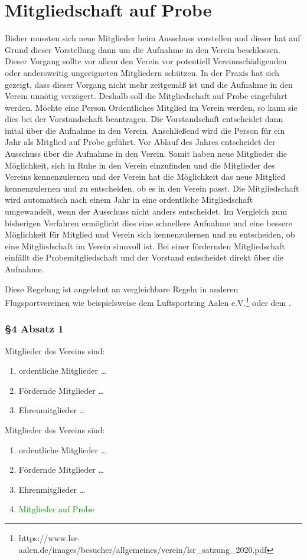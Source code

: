 \documentclass[10pt,a4paper,parskip=half]{scrartcl}
\newcommand{\new}[1]{\textcolor{Green}{#1}}
\newcommand{\change}[1]{
  \begin{adjustwidth}{20pt}{20pt}
    #1
  \end{adjustwidth}
}
\begin{document}
  \section{Mitgliedschaft auf Probe}
  Bisher mussten sich neue Mitglieder beim Ausschuss vorstellen und dieser hat auf Grund dieser Vorstellung dann um die Aufnahme in den Verein beschlossen. Dieser Vorgang sollte vor allem den Verein vor potentiell Vereinsschädigenden oder andersweitig ungeeigneten Mitgliedern schützen. In der Praxis hat sich gezeigt, dass dieser Vorgang nicht mehr zeitgemäß ist und die Aufnahme in den Verein unnötig verzögert. Deshalb soll die Mitgliedschaft auf Probe eingeführt werden. Möchte eine Person Ordentliches Mitglied im Verein werden, so kann sie dies bei der Vorstandschaft beantragen. Die Vorstandschaft entscheidet dann inital über die Aufnahme in den Verein. Anschließend wird die Person für ein Jahr als Mitglied auf Probe geführt. Vor Ablauf des Jahres entscheidet der Ausschuss über die Aufnahme in den Verein. Somit haben neue Mitglieder die Möglichkeit, sich in Ruhe in den Verein einzufinden und die Mitglieder des Vereins kennenzulernen und der Verein hat die Möglichkeit das neue Mitglied kennenzulernen und zu entscheiden, ob es in den Verein passt. Die Mitgliedschaft wird automatisch nach einem Jahr in eine ordentliche Mitgliedschaft umgewandelt, wenn der Ausschuss nicht anders entscheidet. Im Vergleich zum bisherigen Verfahren ermöglicht dies eine schnellere Aufnahme und eine bessere Möglichkeit für Mitglied und Verein sich kennenzulernen und zu entscheiden, ob eine Mitgliedschaft im Verein sinnvoll ist. Bei einer fördernden Mitgliedschaft einfällt die Probemitgliedschaft und der Vorstand entscheidet direkt über die Aufnahme.

  Diese Regelung ist angelehnt an vergleichbare Regeln in anderen Flugsportvereinen wie beispielsweise dem Luftsportring Aalen e.V.\footnote{https://www.lsr-aalen.de/images/besucher/allgemeines/verein/lsr\_satzung\_2020.pdf} oder dem .

  \change{
  \subsubsection*{§4 Absatz 1}
  \begin{multicols}{2}
    Mitglieder des Vereins sind:
    \begin{enumerate}[noitemsep]
      \item ordentliche Mitglieder \dots
      \item Fördernde Mitglieder \dots 
      \item Ehrenmitglieder \dots
    \end{enumerate}
    \columnbreak
    Mitglieder des Vereins sind:
    \begin{enumerate}[noitemsep]
      \item ordentliche Mitglieder \dots
      \item Fördernde Mitglieder \dots 
      \item Ehrenmitglieder \dots
      \item \new{Mitglieder auf Probe}
    \end{enumerate}
    \end{multicols}
  }
\end{document}
